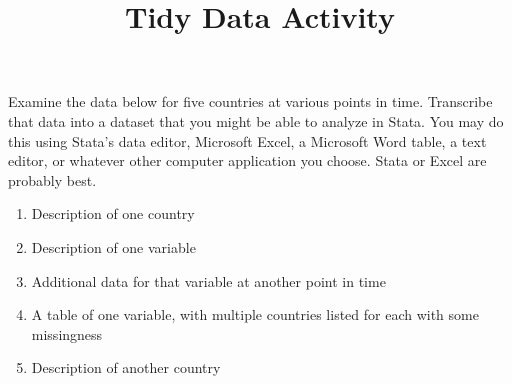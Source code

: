 \documentclass[a4paper,12pt]{article}
\title{Tidy Data Activity}
\author{}
\date{}
\begin{document}
\maketitle

Examine the data below for five countries at various points in time. Transcribe that data into a dataset that you might be able to analyze in Stata. You may do this using Stata's data editor, Microsoft Excel, a Microsoft Word table, a text editor, or whatever other computer application you choose. Stata or Excel are probably best.

\begin{enumerate}\itemsep2em
\item Description of one country

\item Description of one variable

\item Additional data for that variable at another point in time

\item A table of one variable, with multiple countries listed for each with some missingness

\item Description of another country
\end{enumerate}
\end{document}
